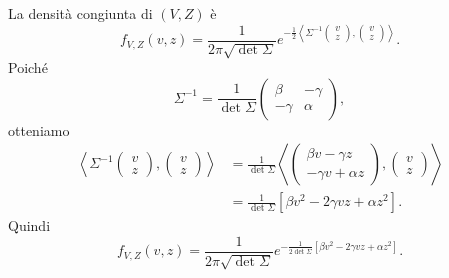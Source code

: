 \documentclass[a4paper]{article}
\begin{document}
\begin{snippetexercise}{}
    La densità congiunta di \((V,Z)\) è
    \[
        f_{V,Z}(v,z)
        =
        \frac{1}{2\pi\sqrt{\det \Sigma}}
        e^{-\frac12
            \left\langle
            \Sigma^{-1}
            \begin{pmatrix}
                v \\ z
            \end{pmatrix},
            \begin{pmatrix}
                v \\ z
            \end{pmatrix}
        \right\rangle}.
    \]
    Poiché
    \[
        \Sigma^{-1}
        =
        \frac{1}{\det \Sigma}
        \begin{pmatrix}
            \beta & -\gamma \\
            -\gamma & \alpha
        \end{pmatrix},
    \]
    otteniamo
    \begin{align*}
        \left\langle
        \Sigma^{-1}
        \begin{pmatrix}
            v \\ z
        \end{pmatrix},
        \begin{pmatrix}
            v \\ z
        \end{pmatrix}
        \right\rangle
        &=
        \frac{1}{\det \Sigma}
        \left\langle
        \begin{pmatrix}
            \beta v - \gamma z \\
            -\gamma v + \alpha z
        \end{pmatrix},
        \begin{pmatrix}
            v \\ z
        \end{pmatrix}
        \right\rangle \\
        &=
        \frac{1}{\det \Sigma}
        \left[
            \beta v^2 - 2\gamma vz + \alpha z^2
        \right].
    \end{align*}
    Quindi
    \[
        f_{V,Z}(v,z)
        =
        \frac{1}{2\pi\sqrt{\det \Sigma}}
        e^{
            -\frac{1}{2\det \Sigma}
            \left[
                \beta v^2 - 2\gamma vz + \alpha z^2
            \right]
        }.
    \]


\end{snippetexercise}
\end{document}
